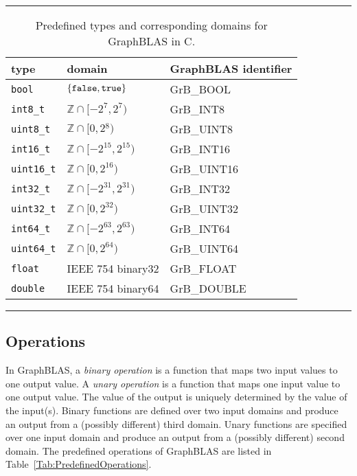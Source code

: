 \begin{table}
\hrule
\begin{center}
\caption{Predefined types and corresponding domains for GraphBLAS in C. 
		}
\label{Tab:PredefinedTypes}
\begin{tabular}{l|l|l}
type	& domain & GraphBLAS identifier \\ \hline
{\tt bool}	& $\{ {\tt false}, {\tt true} \}$	& {\sf GrB\_BOOL} \\
{\tt int8\_t}	& $\mathbb{Z} \cap [-2^{7},2^{7})$ 	& {\sf GrB\_INT8} \\
{\tt uint8\_t}	& $\mathbb{Z} \cap [0,2{^8})$ 		& {\sf GrB\_UINT8} \\
{\tt int16\_t}	& $\mathbb{Z} \cap [-2^{15},2^{15})$ 	& {\sf GrB\_INT16} \\
{\tt uint16\_t}	& $\mathbb{Z} \cap [0,2^{16})$ 		& {\sf GrB\_UINT16} \\
{\tt int32\_t}	& $\mathbb{Z} \cap [-2^{31},2^{31})$ 	& {\sf GrB\_INT32} \\
{\tt uint32\_t}	& $\mathbb{Z} \cap [0,2^{32})$ 		& {\sf GrB\_UINT32} \\
{\tt int64\_t}	& $\mathbb{Z} \cap [-2^{63},2^{63})$ 	& {\sf GrB\_INT64} \\
{\tt uint64\_t}	& $\mathbb{Z} \cap [0,2^{64})$ 		& {\sf GrB\_UINT64} \\
{\tt float}	& IEEE 754 {\sf binary32} 		& {\sf GrB\_FLOAT} \\
{\tt double}	& IEEE 754 {\sf binary64} 		& {\sf GrB\_DOUBLE} \\
\end{tabular}
\end{center}
\hrule
\end{table}

\subsection{Operations}

In GraphBLAS, a \emph{binary operation} is a function that maps two input
values to one output value. A \emph{unary operation} is a function that 
maps one input value to one output value. The value of the output is uniquely
determined by the value of the input(s).
Binary functions are defined over two input domains and produce an output from
a (possibly different) third domain. Unary functions are specified
over one input domain and produce an output from a (possibly different)
second domain.
The predefined operations of GraphBLAS are listed in
Table~\ref{Tab:PredefinedOperations}.

